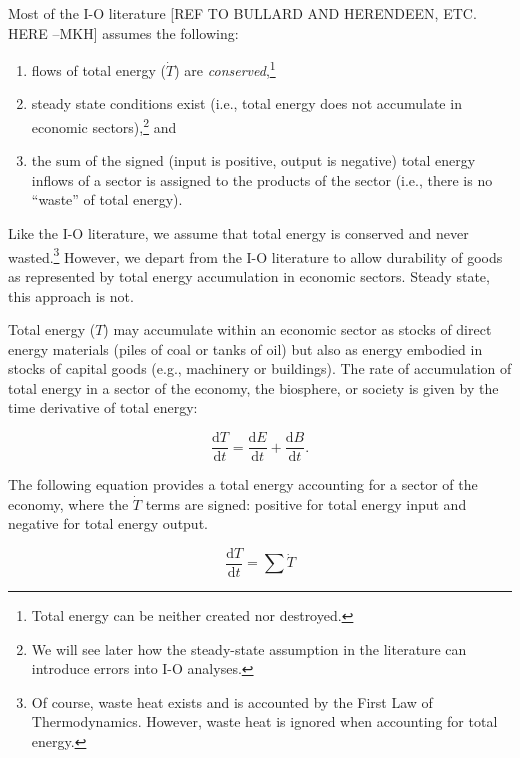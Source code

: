 Most of the I-O literature \cite{Bullard1975, Herendeen1978} 
[REF TO BULLARD AND HERENDEEN, ETC. HERE --MKH] assumes the following:

\begin{enumerate}
	\item flows of total energy ($\dot{T}$) are 
	\emph{conserved},\footnote{Total energy 
	can be neither created nor destroyed.}

	\item steady state conditions exist 
	(i.e., total energy does not accumulate in economic 
	sectors),\footnote{We will see later how the
	steady-state assumption in the literature 
	can introduce errors into I-O analyses.} and
	
	\item the sum of the signed 
	(input is positive, output is negative) 
	total energy inflows of a sector
	is assigned to the products of the sector (i.e., 
	there is no ``waste'' of total energy).
\end{enumerate}

Like the I-O literature, we assume that total energy is conserved
and never wasted.\footnote{Of course, waste heat exists and is
accounted by the First Law of Thermodynamics. However,
waste heat is ignored when accounting for total energy.}
However, we depart from the I-O literature to allow durability of goods 
as represented by total energy accumulation in economic sectors. 
Steady state, this approach is not. 

Total energy ($T$) may accumulate within an economic sector 
as stocks of direct energy materials 
(piles of coal or tanks of oil) 
but also as energy embodied in stocks of capital goods 
(e.g., machinery or buildings). 
The rate of accumulation of total energy 
in a sector of the economy, the biosphere, 
or society is given by the time derivative of total energy:

\begin{equation} \label{eq:T_accum_def}
	\frac{\mathrm{d}T}{\mathrm{d}t} 
	= \frac{\mathrm{d}E}{\mathrm{d}t} 
	+ \frac{\mathrm{d}B}{\mathrm{d}t}.
\end{equation}

The following equation provides a total energy accounting 
for a sector of the economy, where the $\dot{T}$ terms
are signed: positive for total energy input and negative
for total energy output.

\begin{equation} \label{eq:total_energy_accounting}
		\frac{\mathrm{d}T}{\mathrm{d}t}
		= \sum \dot{T}
\end{equation}

